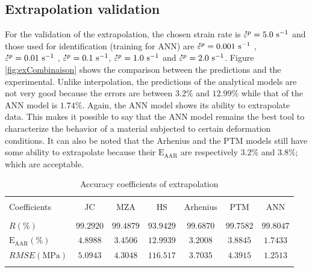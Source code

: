 \documentclass[twoside,english,1p,final,sort&compress]{elsarticle}
\theoremstyle{plain}
\newcommand{\mdot}[1]{\accentset{\mbox{\bfseries .}}{#1}}
\newcommand{\AARE}{\text{E}_\text{AAR}}
\begin{document}
\subsection{Extrapolation validation}
For the validation of the extrapolation, the chosen strain rate is $\mdot\varepsilon^p = 5.0\ \text{s}^{-1}$ and those used for identification (training for ANN) are $\mdot\varepsilon^p = 0.001\ \text{s}^{-1}$ , $\mdot\varepsilon^p = 0.01\ \text{s}^{-1}$ , $\mdot\varepsilon^p = 0.1\ \text{s}^{-1}$, $\mdot\varepsilon^p = 1.0\ \text{s}^{-1}$  and $\mdot\varepsilon^p = 2.0\ \text{s}^{-1}$. Figure \ref{fig:exCombinaison} shows the comparison between the predictions  and the experimental. Unlike interpolation, the predictions of the analytical models are not very good because the errors are between $3.2\%$ and $12.99\%$ while that of the ANN model is $1.74\%$. Again, the ANN model shows its ability to extrapolate data. This makes it possible to say that the ANN model remains the best tool to characterize the behavior of a material subjected to certain deformation conditions. It can also be noted that the Arhenius and the PTM models still have some ability to extrapolate because their $\AARE$ are respectively $ 3.2 \% $ and $ 3.8 \%$; which are acceptable.
\begin{table}[h!]
\centering{}
\caption{Accuracy coefficients of extrapolation}
\begin{tabular}{lcccccc}
\hline
&		&		&         &             &		   &	\\
Coefficients&JC  & MZA  &HS  & Arhenius      & PTM  &ANN \\
&				&				&         &             &	&\\
\hline
$R(\%)$&$99.2920$&$99.4879$&$93.9429$&$99.6870$& $99.7582$&$99.8047$\\
$\AARE(\%)$&$4.8988$&$3.4506$&$12.9939$&$3.2008$&$3.8845$&$1.7433$\\
$RMSE(\text{MPa})$&$5.0943$&$4.3048$&$116.517$&$3.7035$&$4.3915$&$1.2513$ \\
\hline
\label{tab:exValid}
\end{tabular}
\end{table}
\end{document}

